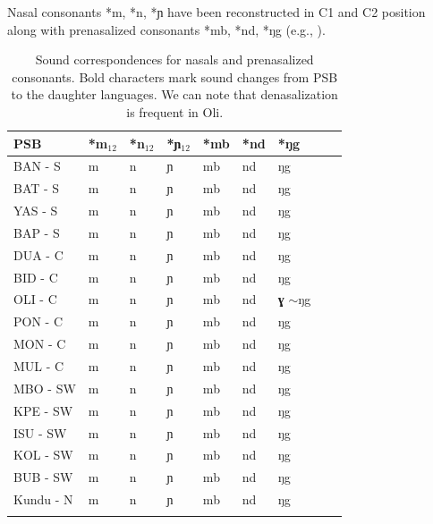 \documentclass[output=paper,colorlinks,citecolor=brown
]{langscibook}
\begin{document}
Nasal consonants *m, *n, *ɲ have been reconstructed in C1 and C2 position along with prenasalized consonants *mb, *nd, *ŋg (e.g., ). 


\begin{table}[p]

\caption{Sound correspondences for nasals and prenasalized consonants. Bold characters mark sound changes from PSB to the daughter languages. We can note that denasalization is frequent in Oli.}
\label{tab:grollemundbrownrule:nasalscorrespondence}
 \begin{tabular}{lllllllll}
  \lsptoprule
\textbf{PSB} & \textbf{*m$_{12}$} & \textbf{*n$_{12}$} & \textbf{*ɲ$_{12}$} & \textbf{*mb} & \textbf{*nd} & \textbf{*ŋg} \\
\midrule
BAN - S      & m             & n             & ɲ             & mb           & nd           & ŋg           \\
BAT - S      & m             & n             & ɲ             & mb           & nd           & ŋg           \\
YAS - S      & m             & n             & ɲ             & mb           & nd           & ŋg           \\
BAP - S      & m             & n             & ɲ             & mb           & nd           & ŋg           \\
DUA - C      & m             & n             & ɲ             & mb           & nd           & ŋg           \\
BID - C      & m             & n             & ɲ             & mb           & nd           & ŋg           \\
OLI - C      & m             & n             & ɲ             & mb           & nd           & \textbf{ɣ} $\sim$ŋg   \\
PON - C      & m             & n             & ɲ             & mb           & nd           & ŋg           \\
MON - C      & m             & n             & ɲ             & mb           & nd           & ŋg           \\
MUL - C      & m             & n             & ɲ             & mb           & nd           & ŋg           \\
MBO - SW     & m             & n             & ɲ             & mb           & nd           & ŋg           \\
KPE - SW     & m             & n             & ɲ             & mb           & nd           & ŋg           \\
ISU - SW     & m             & n             & ɲ             & mb           & nd           & ŋg           \\
KOL - SW     & m             & n             & ɲ             & mb           & nd           & ŋg           \\
BUB - SW     & m             & n             & ɲ             & mb           & nd           & ŋg           \\
Kundu - N    & m             & n             & ɲ             & mb           & nd           & ŋg           \\
   \lspbottomrule
 \end{tabular}
\end{table}
\end{document}
